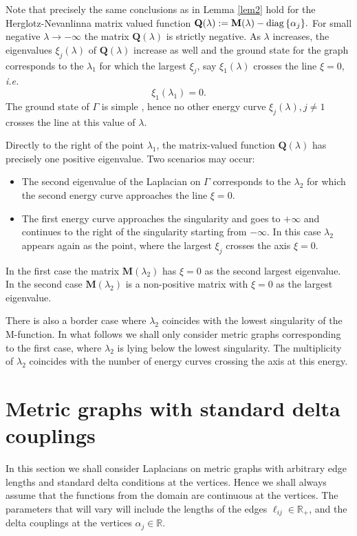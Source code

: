 \documentclass{amsart}
\theoremstyle{definition}
\theoremstyle{remark}
\numberwithin{equation}{section}
\begin{document}
Note that precisely the same conclusions as in Lemma \ref{lem2} hold for the Herglotz-Nevanlinna matrix valued function
$\mathbf Q(\lambda) := \mathbf M (\lambda) - {\rm diag}\, \{ \alpha_j \}. $
For small negative $ \lambda \rightarrow - \infty$ the matrix $ \mathbf Q(\lambda) $ is strictly negative. As $ \lambda $ increases, the eigenvalues
$ \xi_j (\lambda) $ of $ \mathbf Q(\lambda) $  increase as well and the ground state for the graph corresponds to the $ \lambda_1 $ for which the largest
$ \xi_j $, say $ \xi_1 (\lambda) $ crosses the line $ \xi = 0$, {\it i.e.}
$$ \xi_1(\lambda_1) = 0. $$
The ground state of $ \Gamma$ is simple \cite{PK24,Ku19}, hence no other energy curve $ \xi_j (\lambda), j \neq 1 $ crosses the line at this value of $ \lambda$.

Directly to the right of the point $ \lambda_1 $, the matrix-valued function $ \mathbf Q(\lambda) $ has precisely one positive eigenvalue.
Two scenarios may occur:
\begin{itemize}
\item The second eigenvalue of the Laplacian on $ \Gamma $ corresponds to the $ \lambda_2 $ for which the second
energy curve approaches the line $ \xi = 0 $.
\item The first energy curve approaches the singularity and goes to $ + \infty $ and continues to the right of the singularity starting from $- \infty $.
In this case $ \lambda_2 $ appears again as the point, where the largest $ \xi_j$ crosses the axis $ \xi = 0$.
\end{itemize}

In the first case the matrix $ \mathbf M (\lambda_2) $ has $ \xi= 0 $ as the second largest eigenvalue.
In the second case $ \mathbf M (\lambda_2) $ is a non-positive matrix with $ \xi= 0 $ as the largest eigenvalue.


There is also a border case where $ \lambda_2 $ coincides with the lowest singularity of the M-function.
In what follows we shall only consider metric graphs corresponding to the first case, where $ \lambda_2 $ is lying below
the lowest singularity.
The multiplicity of $ \lambda_2 $ coincides with
the number of energy curves crossing the axis at this energy. 


\section{Metric graphs with standard delta couplings} \label{SecMG}

In this section we shall consider Laplacians on metric graphs with arbitrary edge lengths and standard delta conditions at the vertices. Hence
we shall always assume that the functions from the domain are continuous at the vertices. The parameters that will vary will include
the lengths of the edges $ \ell_{ij} \in \mathbb R_+$,
and the delta couplings at the vertices $ \alpha_j \in \mathbb R$.
\end{document}
